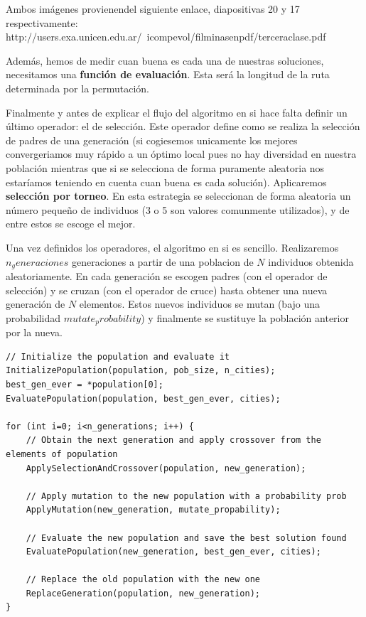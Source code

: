 \documentclass{article}
\begin{document}
Ambos imágenes provienendel siguiente enlace, diapositivas 20 y 17 respectivamente:
http://users.exa.unicen.edu.ar/~icompevol/filminasenpdf/terceraclase.pdf

Además, hemos de medir cuan buena es cada una de nuestras soluciones, necesitamos una \textbf{función de evaluación}. Esta será la longitud de la ruta determinada por la permutación.

Finalmente y antes de explicar el flujo del algoritmo en si hace falta definir un último operador: el de selección. Este operador define como se realiza la selección de padres de una generación (si cogiesemos unicamente los mejores convergeriamos muy rápido a un óptimo local pues no hay diversidad en nuestra población mientras que si se selecciona de forma puramente aleatoria nos estaríamos teniendo en cuenta cuan buena es cada solución). Aplicaremos \textbf{selección por torneo}. En esta estrategia se seleccionan de forma aleatoria un número pequeño de individuos (3 o 5 son valores comunmente utilizados), y de entre estos se escoge el mejor.

Una vez definidos los operadores, el algoritmo en si es sencillo. Realizaremos $n_generaciones$ generaciones a partir de una poblacion de $N$ individuos obtenida aleatoriamente. En cada generación se escogen padres (con el operador de selección) y se cruzan (con el operador de cruce) hasta obtener una nueva generación de $N$ elementos. Estos nuevos individuos se mutan (bajo una probabilidad $mutate_probability$) y finalmente se sustituye la población anterior por la nueva.

\begin{verbatim}
// Initialize the population and evaluate it
InitializePopulation(population, pob_size, n_cities);
best_gen_ever = *population[0];
EvaluatePopulation(population, best_gen_ever, cities);

for (int i=0; i<n_generations; i++) {
	// Obtain the next generation and apply crossover from the elements of population
	ApplySelectionAndCrossover(population, new_generation);
	
	// Apply mutation to the new population with a probability prob
	ApplyMutation(new_generation, mutate_propability);
	
	// Evaluate the new population and save the best solution found
	EvaluatePopulation(new_generation, best_gen_ever, cities);
	
	// Replace the old population with the new one
	ReplaceGeneration(population, new_generation);
}
\end{verbatim}
\end{document}
